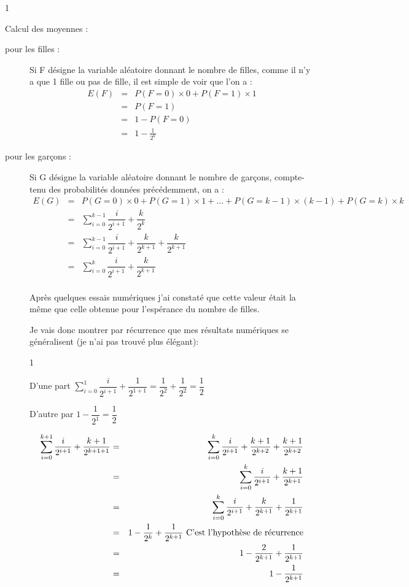 1\documentclass[a4paper, 11pt,french]{article}
\begin{document}
Calcul des moyennes :
\begin{description}
\item[pour les filles : ]
  Si F désigne la variable aléatoire donnant le nombre de filles, comme il n'y a que 1 fille ou pas de fille, il est simple de voir que l'on a :
  \begin{eqnarray*}
    E(F)&=&P(F=0)\times 0 + P(F=1) \times 1\\
    &=& P(F=1)\\
    &=& 1-P(F=0)\\
    &=& 1-\frac{1}{2^k}
  \end{eqnarray*}
\item[pour les garçons : ]
  Si G désigne la variable aléatoire donnant le nombre de garçons, compte-tenu des probabilités données précédemment, on a :
  \begin{eqnarray*}
    E(G)&=&P(G=0)\times 0 + P(G=1)\times 1 + \ldots +P(G=k-1)\times (k-1) + P(G=k) \times k\\
    &=& \sum_{i=0}^{k-1}\dfrac{i}{2^{i+1}} + \dfrac{k}{2^k}\\
    &=& \sum_{i=0}^{k-1}\dfrac{i}{2^{i+1}} + \dfrac{k}{2^{k+1}} + \dfrac{k}{2^{k+1}}\\
    &=& \sum_{i=0}^{k}\dfrac{i}{2^{i+1}} + \dfrac{k}{2^{k+1}}\\
  \end{eqnarray*}

  Après quelques essais numériques j'ai constaté que cette valeur était la même que celle obtenue pour l'espérance du nombre de filles.

  Je vais donc montrer par récurrence que mes résultats numériques se généralisent (je n'ai pas trouvé plus élégant):
  
      {1}
      {D'une part $\sum_{i=0}^{1}\dfrac{i}{2^{i+1}} + \dfrac{1}{2^{1+1}}=\dfrac{1}{2^2}+\dfrac{1}{2^2}=\dfrac{1}{2}$
        
        D'autre par $1-\dfrac{1}{2^1}=\dfrac{1}{2}$
      }
      {       \begin{eqnarray*}
          \sum_{i=0}^{k+1}\dfrac{i}{2^{i+1}} + \dfrac{k+1}{2^{k+1+1}}
          &=&
          \sum_{i=0}^{k}\dfrac{i}{2^{i+1}} + \dfrac{k+1}{2^{k+2}} + \dfrac{k+1}{2^{k+2}}\\
          &=&\sum_{i=0}^{k}\dfrac{i}{2^{i+1}} + \dfrac{k+1}{2^{k+1}} \\
          &=&\sum_{i=0}^{k}\dfrac{i}{2^{i+1}} + \dfrac{k}{2^{k+1}}+ \dfrac{1}{2^{k+1}} \\
          &=&1-\dfrac{1}{2^k}+\dfrac{1}{2^{k+1}} \hfill\makebox{ C'est l'hypothèse de récurrence}\\
          &=&1-\dfrac{2}{2^{k+1}}+\dfrac{1}{2^{k+1}}\\
          &=&1-\dfrac{1}{2^{k+1}}
        \end{eqnarray*}
      }
\end{description}
\end{document}
